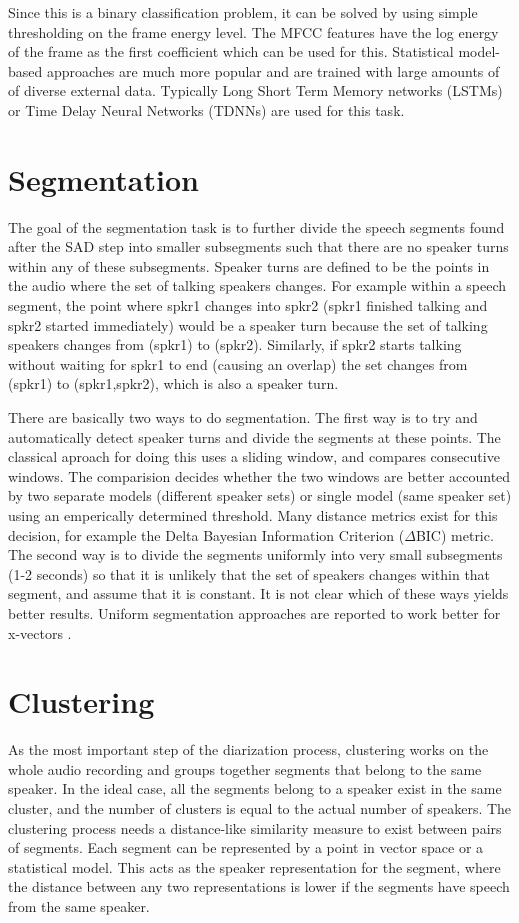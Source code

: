 Since this is a binary classification problem, it can be solved by using simple thresholding on the frame energy level. The MFCC features have the log energy of the frame as the first coefficient which can be used for this. Statistical model-based approaches are much more popular and are trained with large amounts of of diverse external data. Typically Long Short Term Memory networks (LSTMs) or Time Delay Neural Networks (TDNNs) are used for this task.

\section{Segmentation}

The goal of the segmentation task is to further divide the speech segments found after the SAD step into smaller subsegments such that there are no speaker turns within any of these subsegments. Speaker turns are defined to be the points in the audio where the set of talking speakers changes. For example within a speech segment, the point where spkr1 changes into spkr2 (spkr1 finished talking and spkr2 started immediately) would be a speaker turn because the set of talking speakers changes from (spkr1) to (spkr2). Similarly, if spkr2 starts talking without waiting for spkr1 to end (causing an overlap) the set changes from (spkr1) to (spkr1,spkr2), which is also a speaker turn.

There are basically two ways to do segmentation. The first way is to try and automatically detect speaker turns and divide the segments at these points. The classical aproach for doing this uses a sliding window, and compares consecutive windows.	The comparision decides whether the two windows are better accounted by two separate models (different speaker sets) or single model (same speaker set) using an emperically determined threshold. Many distance metrics exist for this decision, for example the Delta Bayesian Information Criterion ($\Delta$BIC) \cite{Chen1998SpeakerE} metric. The second way is to divide the segments uniformly into very small subsegments (1-2 seconds) so that it is unlikely that the set of speakers changes within that segment, and assume that it is constant. It is not clear which of these ways yields better results. Uniform segmentation approaches are reported to work better for x-vectors \cite{patino2018odessa}.

\section{Clustering}
	As the most important step of the diarization process, clustering works on the whole audio recording and groups together segments that belong to the same speaker. In the ideal case, all the segments belong to a speaker exist in the same cluster, and the number of clusters is equal to the actual number of speakers. The clustering process needs a distance-like similarity measure to exist between pairs of segments. Each segment can be represented by a point in vector space or a statistical model. This acts as the speaker representation for the segment, where the distance between any two representations is lower if the segments have speech from the same speaker.
	
